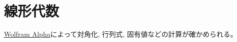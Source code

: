
\chapter{線形代数}
\begin{tips}
\href{https://ja.wolframalpha.com/examples/mathematics/algebra/matrices/}{Wolfram Alpha}によって対角化, 行列式, 固有値などの計算が確かめられる。
\end{tips}
